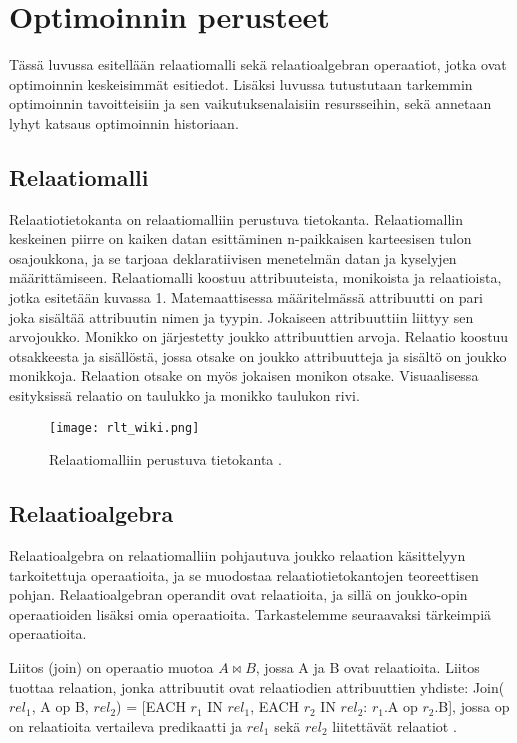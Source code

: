 \documentclass[finnish]{tktltiki2}
\theoremstyle{definition}
\theoremstyle{remark}
\begin{document}
\section{Optimoinnin perusteet}
Tässä luvussa esitellään relaatiomalli sekä relaatioalgebran operaatiot, jotka ovat optimoinnin keskeisimmät esitiedot. Lisäksi luvussa tutustutaan tarkemmin optimoinnin tavoitteisiin ja sen vaikutuksenalaisiin resursseihin, sekä annetaan lyhyt katsaus optimoinnin historiaan.
\subsection{Relaatiomalli}
Relaatiotietokanta on relaatiomalliin \cite{codd1970relational} perustuva tietokanta. Relaatiomallin keskeinen piirre on kaiken datan esittäminen n-paikkaisen karteesisen tulon osajoukkona, ja se tarjoaa deklaratiivisen menetelmän datan ja kyselyjen määrittämiseen. Relaatiomalli koostuu attribuuteista, monikoista ja relaatioista, jotka esitetään kuvassa 1. Matemaattisessa määritelmässä attribuutti on pari joka sisältää attribuutin nimen ja tyypin. Jokaiseen attribuuttiin liittyy sen arvojoukko. Monikko on järjestetty joukko attribuuttien arvoja. Relaatio koostuu otsakkeesta ja sisällöstä, jossa otsake on joukko attribuutteja ja sisältö on joukko monikkoja. Relaation otsake on myös jokaisen monikon otsake. Visuaalisessa esityksissä relaatio on taulukko ja monikko taulukon rivi. 

\begin{figure}[!h] 
  \centering
    \texttt{[image: rlt\_wiki.png]}
  \caption{Relaatiomalliin perustuva tietokanta \cite{wiki2008}.}
\end{figure}

\subsection{Relaatioalgebra}
Relaatioalgebra on relaatiomalliin pohjautuva joukko relaation käsittelyyn tarkoitettuja operaatioita, ja se muodostaa relaatiotietokantojen teoreettisen pohjan. Relaatioalgebran operandit ovat relaatioita, ja sillä on joukko-opin operaatioiden lisäksi omia operaatioita. Tarkastelemme seuraavaksi tärkeimpiä operaatioita.

Liitos (join) on operaatio muotoa $A\bowtie B$, jossa A ja B ovat relaatioita. Liitos tuottaa relaation, jonka attribuutit ovat relaatiodien attribuuttien yhdiste: 
\newline Join($rel_ 1$, A op B, $rel_2$) = [EACH $r_1$ IN $rel_1$, EACH $r_2$ IN $rel_2$: $r_1$.A op $r_2$.B], jossa op on relaatioita vertaileva predikaatti ja $rel_1$ sekä $rel_2$ liitettävät relaatiot \cite{jarke1984}.
\end{document}

